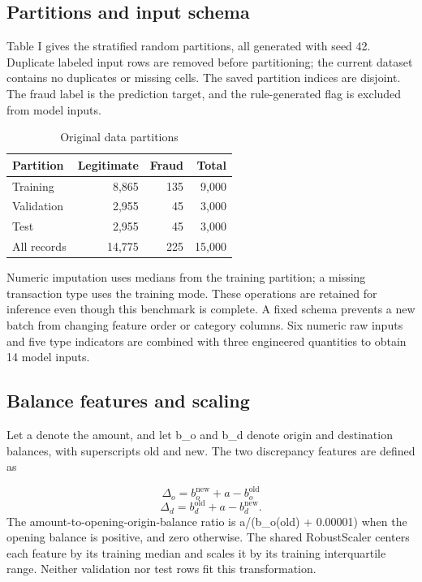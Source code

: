 \documentclass[conference]{IEEEtran}
\begin{document}
\subsection{Partitions and input schema}
Table I gives the stratified random partitions, all generated with seed 42. Duplicate labeled input rows are removed before partitioning; the current dataset contains no duplicates or missing cells. The saved partition indices are disjoint. The fraud label is the prediction target, and the rule-generated flag is excluded from model inputs.

\begin{table}[t]
\caption{Original data partitions}
\centering\footnotesize
\setlength{\tabcolsep}{3pt}
\begin{tabular}{lrrr}
\toprule
Partition & Legitimate & Fraud & Total\\
\midrule
Training & 8,865 & 135 & 9,000\\
Validation & 2,955 & 45 & 3,000\\
Test & 2,955 & 45 & 3,000\\
All records & 14,775 & 225 & 15,000\\
\bottomrule
\end{tabular}
\end{table}
Numeric imputation uses medians from the training partition; a missing transaction type uses the training mode. These operations are retained for inference even though this benchmark is complete. A fixed schema prevents a new batch from changing feature order or category columns. Six numeric raw inputs and five type indicators are combined with three engineered quantities to obtain 14 model inputs.

\subsection{Balance features and scaling}
Let a denote the amount, and let b\_o and b\_d denote origin and destination balances, with superscripts old and new. The two discrepancy features are defined as

\begin{equation}
\Delta_o=b_o^{\mathrm{new}}+a-b_o^{\mathrm{old}}
\end{equation}
\begin{equation}
\Delta_d=b_d^{\mathrm{old}}+a-b_d^{\mathrm{new}}.
\end{equation}
The amount-to-opening-origin-balance ratio is a/(b\_o(old) + 0.00001) when the opening balance is positive, and zero otherwise. The shared RobustScaler centers each feature by its training median and scales it by its training interquartile range. Neither validation nor test rows fit this transformation.
\end{document}
